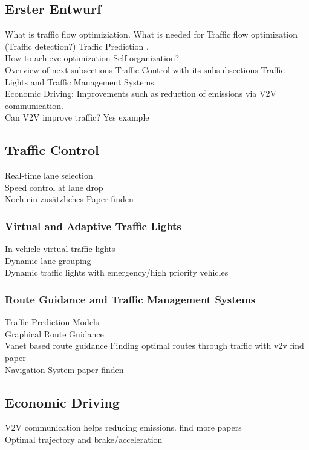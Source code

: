 \documentclass{sig-alternate}
\begin{document}
\subsection{Erster Entwurf}

What is traffic flow optimiziation. What is needed for Traffic flow optimization (Traffic detection?) Traffic Prediction \cite{6856591}. \\ How to achieve optimization Self-organization?\cite{5625236} \\Overview of next subsections Traffic Control with its subsubsections Traffic Lights and Traffic Management Systems. \\
Economic Driving: Improvements such as reduction of emissions via V2V communication.  \\
Can V2V  improve traffic?  Yes example\cite{6856462}
\subsection{Traffic Control}
Real-time lane selection\cite{6856515} \\
Speed control at lane drop \cite{1614269.1614274}\\
Noch ein zusätzliches Paper finden\\
\subsubsection{Virtual and Adaptive Traffic Lights}
In-vehicle virtual traffic lights\cite{ferreira2010self}  \cite{gradinescu2007adaptive} \\ 
Dynamic lane grouping \cite{6338840} \\
Dynamic traffic lights with emergency/high priority vehicles \cite{6799827} \\
\subsubsection{Route Guidance and Traffic Management Systems}
Traffic Prediction Models \cite{6685576} \\
Graphical Route Guidance \cite{5410169} \\
Vanet based route guidance \cite{6799873}
Finding optimal routes through traffic with v2v  find paper \\
Navigation System paper finden\\
\subsection{Economic Driving}
V2V communication helps reducing emissions. find more papers \\
Optimal trajectory and brake/acceleration \cite{6856456} 
\end{document}
